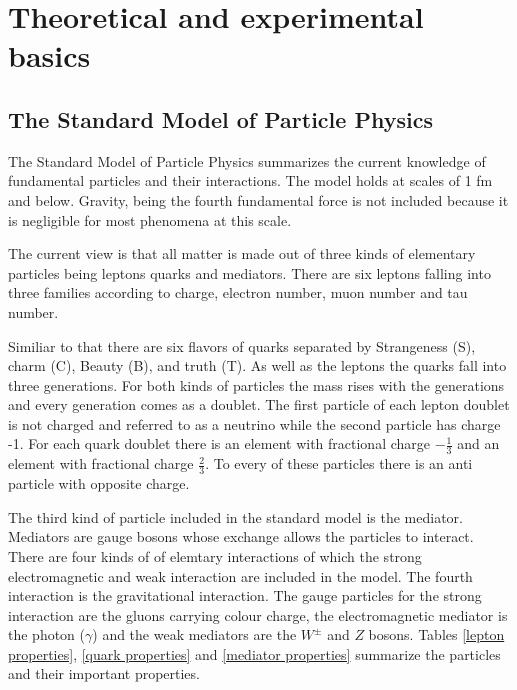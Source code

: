 \chapter{Theoretical and experimental basics}
\label{theory}

\section{The Standard Model of Particle Physics}

The Standard Model of Particle Physics summarizes the current knowledge of fundamental particles and their interactions. The model holds at scales of 1 fm and below. Gravity, being the fourth fundamental force is not included because it is negligible for most phenomena at this scale.

The current view is that all matter is made out of three kinds of elementary particles being leptons quarks and mediators.
There are six leptons falling into three families according to charge, electron number, muon number and tau number. 

Similiar to that there are six flavors of quarks separated by Strangeness (S), charm (C), Beauty (B), and truth (T). As well as the leptons the quarks fall into three generations.
For both kinds of particles the mass rises with the generations and every generation comes as a doublet. The first particle of each lepton doublet is not charged and referred to as a neutrino while the second particle has charge -1.
For each quark doublet there is an element with fractional charge $-\frac{1}{3}$ and an element with fractional charge $\frac{2}{3}$.
To every of these particles there is an anti particle with opposite charge.

The third kind of particle included in the standard model is the mediator. Mediators are gauge bosons whose exchange allows the particles to interact. There are four kinds of of elemtary interactions of which the strong electromagnetic and weak interaction are included in the model. The fourth interaction is the gravitational interaction.
The gauge particles for the strong interaction are the gluons carrying colour charge, the electromagnetic mediator is the photon ($\gamma$) and the weak mediators are the $W^{\pm}$ and $Z$ bosons.
Tables \ref{lepton properties}, \ref{quark properties} and \ref{mediator properties} summarize the particles and their important properties.
\newpage


